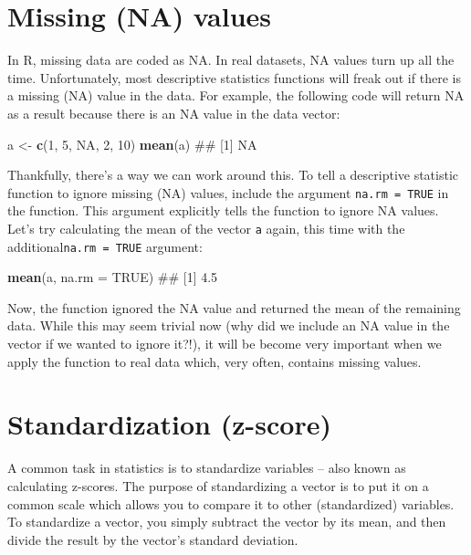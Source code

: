 \documentclass[]{book}
\newenvironment{Shaded}{\begin{snugshade}}{\end{snugshade}}
\newcommand{\KeywordTok}[1]{\textcolor[rgb]{0.13,0.29,0.53}{\textbf{#1}}}
\newcommand{\DataTypeTok}[1]{\textcolor[rgb]{0.13,0.29,0.53}{#1}}
\newcommand{\DecValTok}[1]{\textcolor[rgb]{0.00,0.00,0.81}{#1}}
\newcommand{\StringTok}[1]{\textcolor[rgb]{0.31,0.60,0.02}{#1}}
\newcommand{\OtherTok}[1]{\textcolor[rgb]{0.56,0.35,0.01}{#1}}
\newcommand{\NormalTok}[1]{#1}
\theoremstyle{definition}
\theoremstyle{definition}
\theoremstyle{remark}
\begin{document}
\section{Missing (NA) values}\label{missing-na-values}

In R, missing data are coded as NA. In real datasets, NA values turn up
all the time. Unfortunately, most descriptive statistics functions will
freak out if there is a missing (NA) value in the data. For example, the
following code will return NA as a result because there is an NA value
in the data vector:

\begin{Shaded}
\begin{Highlighting}[]
\NormalTok{a <-}\StringTok{ }\KeywordTok{c}\NormalTok{(}\DecValTok{1}\NormalTok{, }\DecValTok{5}\NormalTok{, }\OtherTok{NA}\NormalTok{, }\DecValTok{2}\NormalTok{, }\DecValTok{10}\NormalTok{)}
\KeywordTok{mean}\NormalTok{(a)}
\NormalTok{## [1] NA}
\end{Highlighting}
\end{Shaded}

Thankfully, there's a way we can work around this. To tell a descriptive
statistic function to ignore missing (NA) values, include the argument
\texttt{na.rm\ =\ TRUE} in the function. This argument explicitly tells
the function to ignore NA values. Let's try calculating the mean of the
vector \texttt{a} again, this time with the
additional\texttt{na.rm\ =\ TRUE} argument:

\begin{Shaded}
\begin{Highlighting}[]
\KeywordTok{mean}\NormalTok{(a, }\DataTypeTok{na.rm =} \OtherTok{TRUE}\NormalTok{)}
\NormalTok{## [1] 4.5}
\end{Highlighting}
\end{Shaded}

Now, the function ignored the NA value and returned the mean of the
remaining data. While this may seem trivial now (why did we include an
NA value in the vector if we wanted to ignore it?!), it will be become
very important when we apply the function to real data which, very
often, contains missing values.

\section{Standardization (z-score)}\label{standardization-z-score}

A common task in statistics is to standardize variables -- also known as
calculating z-scores. The purpose of standardizing a vector is to put it
on a common scale which allows you to compare it to other (standardized)
variables. To standardize a vector, you simply subtract the vector by
its mean, and then divide the result by the vector's standard deviation.
\end{document}
